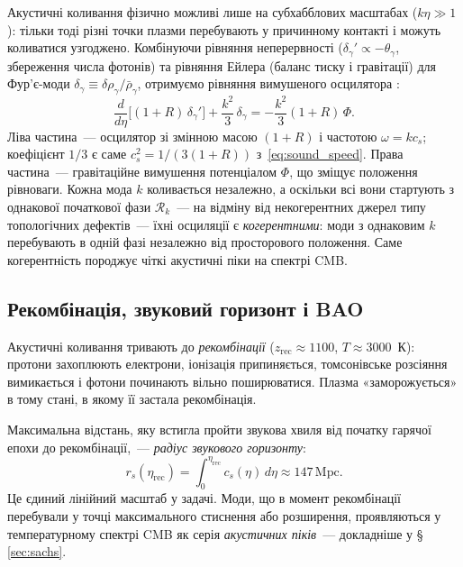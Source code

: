 \documentclass[12pt, a4paper]{article}
\begin{document}
Акустичні коливання фізично можливі лише на субхабблових
масштабах ($k\eta \gg 1$): тільки тоді різні точки плазми
перебувають у причинному контакті і можуть коливатися
узгоджено. Комбінуючи рівняння неперервності
($\delta_\gamma' \propto -\theta_\gamma$, збереження числа
фотонів) та рівняння Ейлера (баланс тиску і гравітації)
для Фур'є-моди $\delta_\gamma \equiv
\delta\rho_\gamma/\bar{\rho}_\gamma$, отримуємо рівняння
вимушеного осцилятора \cite{dodelson_2020}:
\begin{equation}\label{eq:acoustic_oscillator}
  \frac{d}{d\eta}\bigl[(1+R)\,\delta_\gamma'\bigr]
  + \frac{k^2}{3}\,\delta_\gamma
  = -\frac{k^2}{3}(1+R)\,\Phi.
\end{equation}
Ліва частина~--- осцилятор зі змінною масою $(1+R)$
і частотою $\omega = kc_s$; коефіцієнт $1/3$ є саме
$c_s^2 = 1/(3(1+R))$ з~\eqref{eq:sound_speed}. Права
частина~--- гравітаційне вимушення потенціалом $\Phi$,
що зміщує положення рівноваги. Кожна мода $k$ коливається
незалежно, а оскільки всі вони стартують з однакової
початкової фази $\mathcal{R}_k$~--- на відміну від
некогерентних джерел типу топологічних дефектів~--- їхні
осциляції є \emph{когерентними}: моди з однаковим $k$
перебувають в одній фазі незалежно від просторового
положення. Саме когерентність породжує чіткі акустичні
піки на спектрі CMB.

\subsection{Рекомбінація, звуковий горизонт і BAO}

Акустичні коливання тривають до \emph{рекомбінації}
($z_\mathrm{rec} \approx 1100$, $T \approx 3000$~К):
протони захоплюють електрони, іонізація припиняється,
томсонівське розсіяння вимикається і фотони починають
вільно поширюватися. Плазма «заморожується» в тому стані,
в якому її застала рекомбінація.

Максимальна відстань, яку встигла пройти звукова хвиля
від початку гарячої епохи до рекомбінації,~---
\emph{радіус звукового горизонту}:
\begin{equation}\label{eq:sound_horizon}
  r_s(\eta_\mathrm{rec})
    = \int_0^{\eta_\mathrm{rec}} c_s(\eta)\,d\eta
    \approx 147\,\mathrm{Mpc}.
\end{equation}
Це єдиний лінійний масштаб у задачі. Моди, що в момент
рекомбінації перебували у точці максимального стиснення
або розширення, проявляються у температурному спектрі
CMB як серія \emph{акустичних піків}~--- докладніше
у §\,\ref{sec:sachs}.
\end{document}
